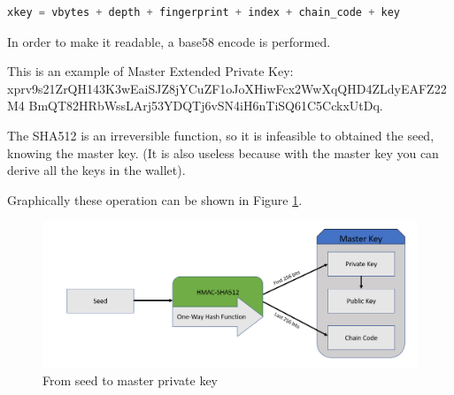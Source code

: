 \begin{lstlisting}[language=Python]
xkey = vbytes + depth + fingerprint + index + chain_code + key
\end{lstlisting}
\begin{flushleft}
	In order to make it readable, a base58 encode is performed.
\end{flushleft}
This is an example of Master Extended Private Key: \\
xprv9s21ZrQH143K3wEaiSJZ8jYCuZF1oJoXHiwFcx2WwXqQHD4ZLdyEAFZ22M4 BmQT82HRbWssLArj53YDQTj6vSN4iH6nTiSQ61C5CckxUtDq.

\begin{remark}
	The SHA512 is an irreversible function, so it is infeasible to obtained the seed, knowing the master key. (It is also useless because with the master key you can derive all the keys in the wallet).
\end{remark}

\begin{flushleft}
	Graphically these operation can be shown in Figure \ref{fig:From seed to master private key}.
\end{flushleft}

\begin{figure}[ht!]
	\centering
	\includegraphics[width=14.5cm]{Figures/seed_to_xprv_v2.png}
	\caption{From seed to master private key}
	\label{fig:From seed to master private key}
\end{figure}


